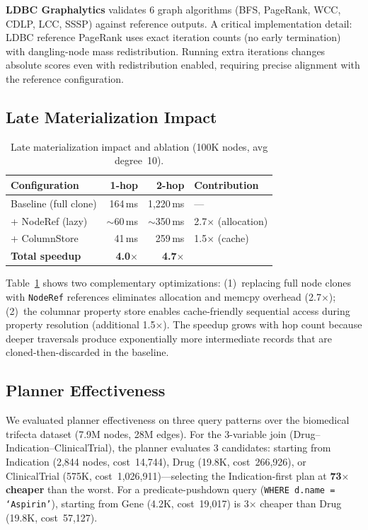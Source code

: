 \documentclass[sigconf, nonacm]{acmart}
\begin{document}
\textbf{LDBC Graphalytics} validates 6 graph algorithms (BFS, PageRank, WCC, CDLP, LCC, SSSP) against reference outputs.
A critical implementation detail: LDBC reference PageRank uses exact iteration counts (no early termination) with dangling-node mass redistribution.
Running extra iterations changes absolute scores even with redistribution enabled, requiring precise alignment with the reference configuration.

\subsection{Late Materialization Impact}
\label{sec:late-mat-eval}

\begin{table}[!htbp]
\caption{Late materialization impact and ablation (100K nodes, avg degree~10).}
\label{tab:late-mat}
\begin{tabular}{lrrl}
\toprule
\textbf{Configuration} & \textbf{1-hop} & \textbf{2-hop} & \textbf{Contribution} \\
\midrule
Baseline (full clone) & 164\,ms & 1,220\,ms & --- \\
+ NodeRef (lazy) & ${\sim}$60\,ms & ${\sim}$350\,ms & 2.7$\times$ (allocation) \\
+ ColumnStore & 41\,ms & 259\,ms & 1.5$\times$ (cache) \\
\midrule
\textbf{Total speedup} & \textbf{4.0$\times$} & \textbf{4.7$\times$} & \\
\bottomrule
\end{tabular}
\end{table}

Table~\ref{tab:late-mat} shows two complementary optimizations:
(1)~replacing full node clones with \texttt{NodeRef} references eliminates allocation and memcpy overhead (2.7$\times$);
(2)~the columnar property store enables cache-friendly sequential access during property resolution (additional 1.5$\times$).
The speedup grows with hop count because deeper traversals produce exponentially more intermediate records that are cloned-then-discarded in the baseline.

\subsection{Planner Effectiveness}
\label{sec:planner-eval}

We evaluated planner effectiveness on three query patterns over the biomedical trifecta dataset (7.9M nodes, 28M edges).
For the 3-variable join (Drug--Indication--ClinicalTrial), the planner evaluates 3 candidates: starting from Indication (2,844 nodes, cost~14,744), Drug (19.8K, cost~266,926), or ClinicalTrial (575K, cost~1,026,911)---selecting the Indication-first plan at \textbf{73$\times$ cheaper} than the worst.
For a predicate-pushdown query (\texttt{WHERE d.name = `Aspirin'}), starting from Gene (4.2K, cost~19,017) is 3$\times$ cheaper than Drug (19.8K, cost~57,127).
\end{document}
